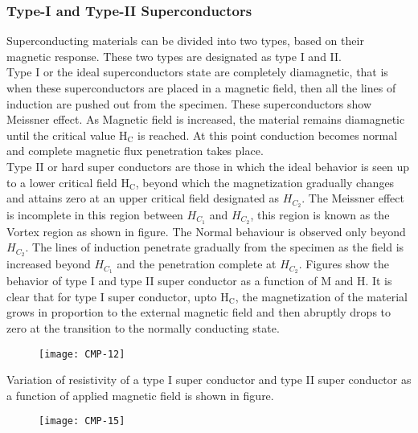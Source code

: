 \subsubsection{Type-I and Type-II Superconductors}
Superconducting materials can be divided into two types, based on their magnetic response. These two types are designated as type I and II.\\
Type I or the ideal superconductors state are completely diamagnetic, that is when these superconductors are placed in a magnetic field, then all the lines of induction are pushed out from the specimen. These superconductors show Meissner effect. As Magnetic field is increased, the material remains diamagnetic until the critical value $\mathrm{H}_{\mathrm{C}}$ is reached. At this point conduction becomes normal and complete magnetic flux penetration takes place.\\
Type II or hard super conductors are those in which the ideal behavior is seen up to a lower critical field $\mathrm{H}_{\mathrm{C}}$, beyond which the magnetization gradually changes and attains zero at an upper critical field designated as $H_{C_{2}}$. The Meissner effect is incomplete in this region between $H_{C_{1}}$ and $H_{C_{2}}$, this region is known as the Vortex region as shown in figure. The Normal behaviour is observed only beyond $H_{C_{2}}$. The lines of induction penetrate gradually from the specimen as the field is increased beyond $H_{C_{1}}$ and the penetration complete at $H_{C_{2}}$. Figures show the behavior of type I and type II super conductor as a function of $\mathrm{M}$ and $\mathrm{H}$. It is clear that for type I super conductor, upto $\mathrm{H}_{\mathrm{C}}$, the magnetization of the material grows in proportion to the external magnetic field and then abruptly drops to zero at the transition to the normally conducting state.
\begin{figure}[H]
	\centering
	\texttt{[image: CMP-12]}
	\caption{}
	\label{}
\end{figure}
Variation of resistivity of a type I super conductor and type II super conductor as a function of applied magnetic field is shown in figure.
\begin{figure}[H]
	\centering
	\texttt{[image: CMP-15]}
	\caption{}
	\label{}
\end{figure}
